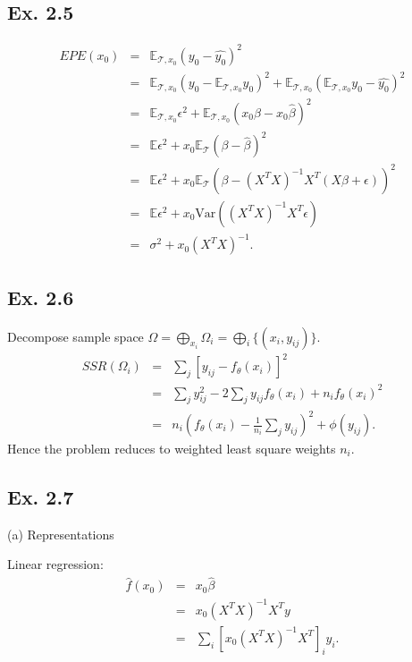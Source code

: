 \subsection*{Ex. 2.5}
\begin{eqnarray*}
EPE(x_0) &=& \mathbb{E}_{\mathcal{T}, x_0}(y_0 - \hat{y_0})^2 \\
         &=& \mathbb{E}_{\mathcal{T}, x_0}(y_0 - \mathbb{E}_{\mathcal{T}, x_0}y_0)^2 + \mathbb{E}_{\mathcal{T}, x_0}(\mathbb{E}_{\mathcal{T}, x_0}y_0- \hat{y_0})^2 \\
         &=& \mathbb{E}_{\mathcal{T}, x_0}\epsilon^2 + \mathbb{E}_{\mathcal{T}, x_0}(x_0\beta - x_0\hat{\beta})^2 \\
         &=& \mathbb{E}\epsilon^2 +  x_0\mathbb{E}_{\mathcal{T}}(\beta - \hat{\beta})^2 \\
         &=& \mathbb{E}\epsilon^2 +  x_0\mathbb{E}_{\mathcal{T}}\left(\beta - (X^TX)^{-1}X^{T}(X\beta + \epsilon)\right)^2 \\
         &=& \mathbb{E}\epsilon^2 +  x_0\mbox{Var}\left((X^TX)^{-1}X^{T}\epsilon\right) \\
         &=& \sigma^2 +  x_0 (X^TX)^{-1}.
\end{eqnarray*}

\subsection*{Ex. 2.6}
Decompose sample space $\Omega=\bigoplus_{x_i}\Omega_i=\bigoplus_{i}\{(x_i, y_{ij})\}.$
\begin{eqnarray*}
SSR(\Omega_i) &=& \sum_{j}[y_{ij} - f_{\theta}(x_{i})]^2 \\
&=&\sum_{j}y_{ij}^2-2 \sum_{j}y_{ij}f_{\theta}(x_{i}) + n_if_{\theta}(x_{i})^2\\
&=&n_{i}\left(f_{\theta}(x_{i}) - \frac{1}{n_{i}}\sum_{j}y_{ij}\right)^2 + \phi(y_{ij}).
\end{eqnarray*}
Hence the problem reduces to weighted least square weights $n_{i}$.

\subsection*{Ex. 2.7}
(a) Representations

Linear regression:
\begin{eqnarray*}
\hat{f}(x_0)&=&x_0\hat{\beta} \\
&=& x_0 (X^{T}X)^{-1} X^{T}y \\
&=& \sum_{i} [x_0 (X^{T}X)^{-1} X^{T}]_{i}y_{i}.
\end{eqnarray*}

